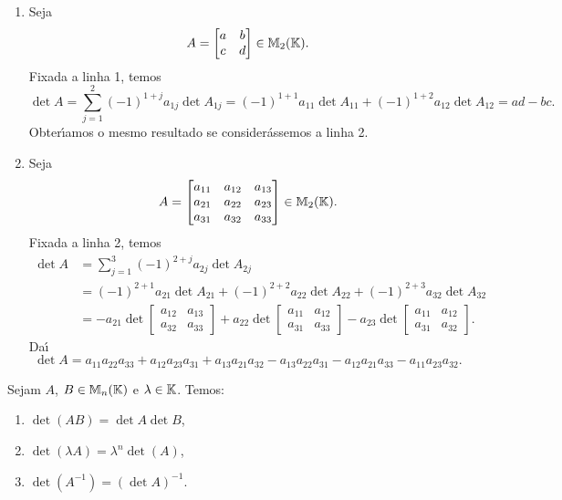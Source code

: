 \begin{exemplo}
\begin{enumerate}[label={\arabic*})]
	\item Seja
	\[
	A = \begin{bmatrix}
	a & b\\
	c & d
	\end{bmatrix} \in \mathbb{M}_2(\mathbb{K}).
	\]
	Fixada a linha 1, temos
	\[
	\det A = \sum_{j = 1}^2(-1)^{1 + j}a_{1j}\det A_{1j} = (-1)^{1 + 1}a_{11}\det A_{11} + (-1)^{1 + 2}a_{12}\det A_{12} = ad - bc.
	\]
	Obter{\'\i}amos o mesmo resultado se consider\'assemos a linha 2.

	\item Seja
	\[
	A = \begin{bmatrix}
	a_{11} & a_{12} & a_{13}\\
	a_{21} & a_{22} & a_{23}\\
	a_{31} & a_{32} & a_{33}
	\end{bmatrix} \in \mathbb{M}_2(\mathbb{K}).
	\]
	Fixada a linha 2, temos
	\begin{align*}
	\det A &= \sum_{j = 1}^3(-1)^{2 + j}a_{2j}\det A_{2j} \\ &= (-1)^{2 + 1}a_{21}\det A_{21} + (-1)^{2 + 2}a_{22}\det A_{22} + (-1)^{2 + 3}a_{32}\det A_{32}\\ &= -a_{21}\det\begin{bmatrix}a_{12} & a_{13}\\a_{32} & a_{33}\end{bmatrix} + a_{22}\det\begin{bmatrix}a_{11} & a_{12}\\a_{31} & a_{33}\end{bmatrix} - a_{23}\det\begin{bmatrix}a_{11} & a_{12}\\a_{31} & a_{32}\end{bmatrix}.
	\end{align*}
	Da{\'\i}
	\[
	\det A = a_{11}a_{22}a_{33} + a_{12}a_{23}a_{31} + a_{13}a_{21}a_{32} - a_{13}a_{22}a_{31} - a_{12}a_{21}a_{33} - 
	a_{11}a_{23}a_{32}.
	\]
\end{enumerate}
\end{exemplo}

\begin{proposicao}
	Sejam $A$, $B \in \mathbb{M}_n(\mathbb{K})$ e $\lambda \in \mathbb{K}$. Temos:
	\begin{enumerate}[label={\roman*})]
		\item $\det(AB) = \det A \det B$,
		\item $\det(\lambda A) = \lambda^n \det(A)$,
		\item $\det(A^{-1}) = (\det A)^{-1}$.
	\end{enumerate}
\end{proposicao}


